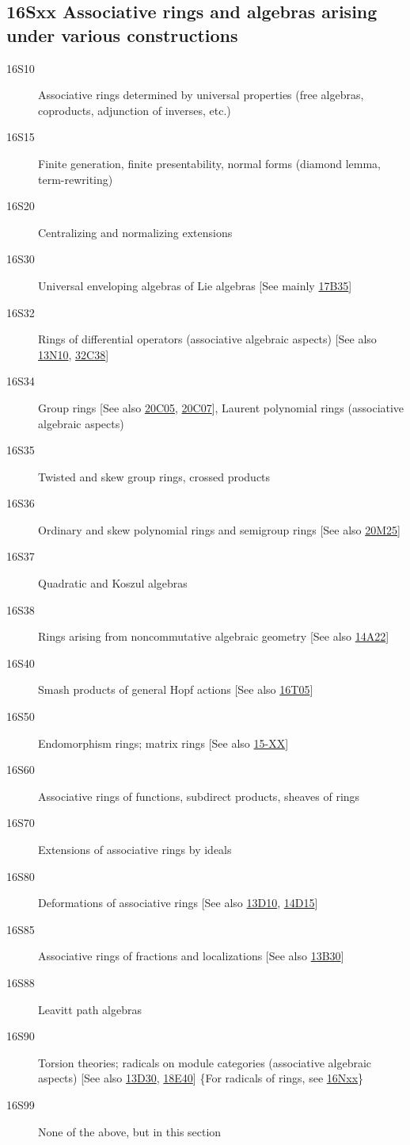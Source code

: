\documentclass[letterpaper]{article}
\begin{document}
\subsection*{16Sxx Associative rings and algebras arising under various constructions}\label{16Sxx}
\begin{description}  
\item [16S10]\label{16S10} Associative rings determined by universal properties (free algebras, coproducts, adjunction of inverses, etc.)
\item [16S15]\label{16S15} Finite generation, finite presentability, normal forms (diamond lemma, term-rewriting)
\item [16S20]\label{16S20} Centralizing and normalizing extensions
\item [16S30]\label{16S30} Universal enveloping algebras of Lie algebras [See mainly \hyperref[17B35]{17B35}]
\item [16S32]\label{16S32} Rings of differential operators (associative algebraic aspects) [See also \hyperref[13N10]{13N10}, \hyperref[32C38]{32C38}]
\item [16S34]\label{16S34} Group rings [See also \hyperref[20C05]{20C05}, \hyperref[20C07]{20C07}], Laurent polynomial rings (associative algebraic aspects)
\item [16S35]\label{16S35} Twisted and skew group rings, crossed products
\item [16S36]\label{16S36} Ordinary and skew polynomial rings and semigroup rings [See also \hyperref[20M25]{20M25}]
\item [16S37]\label{16S37} Quadratic and Koszul algebras
\item [16S38]\label{16S38} Rings arising from noncommutative algebraic geometry [See also \hyperref[14A22]{14A22}]
\item [16S40]\label{16S40} Smash products of general Hopf actions [See also \hyperref[16T05]{16T05}]
\item [16S50]\label{16S50} Endomorphism rings; matrix rings [See also \hyperref[15-XX]{15-XX}]
\item [16S60]\label{16S60} Associative rings of functions, subdirect products, sheaves of rings
\item [16S70]\label{16S70} Extensions of associative rings by ideals
\item [16S80]\label{16S80} Deformations of associative rings [See also \hyperref[13D10]{13D10}, \hyperref[14D15]{14D15}]
\item [16S85]\label{16S85} Associative rings of fractions and localizations [See also \hyperref[13B30]{13B30}]
\item [16S88]\label{16S88} Leavitt path algebras
\item [16S90]\label{16S90} Torsion theories; radicals on module categories (associative algebraic aspects) [See also \hyperref[13D30]{13D30}, \hyperref[18E40]{18E40}] \{For radicals of rings, see \hyperref[16Nxx]{16Nxx}\}
\item [16S99]\label{16S99} None of the above, but in this section
\end{description}
\end{document}
